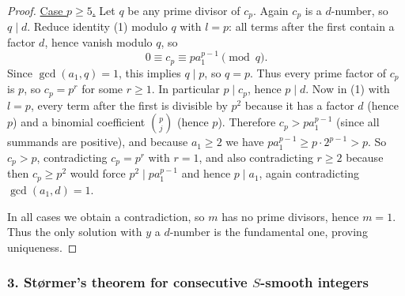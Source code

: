 \begin{proof}
\smallskip
\noindent\underline{Case $p\ge 5$.}
Let $q$ be any prime divisor of $c_p$.
Again $c_p$ is a $d$-number, so $q\mid d$.
Reduce identity (1) modulo $q$ with $l=p$:
all terms after the first contain a factor $d$, hence vanish modulo $q$, so
\[
0\equiv c_p \equiv p a_1^{p-1}\pmod q.
\]
Since $\gcd(a_1,q)=1$, this implies $q\mid p$, so $q=p$.
Thus every prime factor of $c_p$ is $p$, so $c_p=p^r$ for some $r\ge 1$.
In particular $p\mid c_p$, hence $p\mid d$.
Now in (1) with $l=p$, every term after the first is divisible by $p^2$ because it has a factor $d$ (hence $p$) and a binomial coefficient $\binom{p}{j}$ (hence $p$).
Therefore $c_p > p a_1^{p-1}$ (since all summands are positive), and because $a_1\ge 2$ we have $p a_1^{p-1}\ge p\cdot 2^{p-1} > p$.
So $c_p>p$, contradicting $c_p=p^r$ with $r=1$, and also contradicting $r\ge 2$ because then $c_p\ge p^2$ would force $p^2\mid p a_1^{p-1}$ and hence $p\mid a_1$, again contradicting $\gcd(a_1,d)=1$.

\smallskip
\noindent In all cases we obtain a contradiction, so $m$ has no prime divisors, hence $m=1$.
Thus the only solution with $y$ a $d$-number is the fundamental one, proving uniqueness.
\end{proof}

\subsubsection*{3. St\o rmer's theorem for consecutive $S$-smooth integers}
